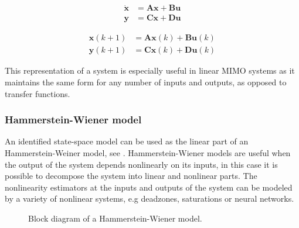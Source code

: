 \begin{equation}\label{eq:ssc}
\begin{split}
\dot{\mathbf{x}} &= \mathbf{A}\mathbf{x} + \mathbf{B}\mathbf{u} \\
\mathbf{y} &= \mathbf{C}\mathbf{x} + \mathbf{D}\mathbf{u}
\end{split}
\end{equation}

\begin{equation}\label{eq:ssd}
\begin{split}
\mathbf{x}(k+1) &= \mathbf{A}\mathbf{x}(k) + \mathbf{B}\mathbf{u}(k)\\
\mathbf{y}(k+1) &= \mathbf{C}\mathbf{x}(k) + \mathbf{D}\mathbf{u}(k)
\end{split}
\end{equation}




This representation of a system is especially useful in linear MIMO systems as it maintains the same form for any number of inputs and outputs, as opposed to transfer functions.

\subsubsection{Hammerstein-Wiener model}
An identified state-space model can be used as the linear part of an Hammerstein-Weiner model, see .
Hammerstein-Wiener models are useful when the output of the system depends nonlinearly on its inputs, in this case it is possible to decompose the system into linear and nonlinear parts. 
The nonlinearity estimators at the inputs and outputs of the system can be modeled by a variety of nonlinear systems, e.g deadzones, saturations or neural networks.

\begin{figure}[H]
\caption{Block diagram of a Hammerstein-Wiener model.}
\label{weiner}
\end{figure}

